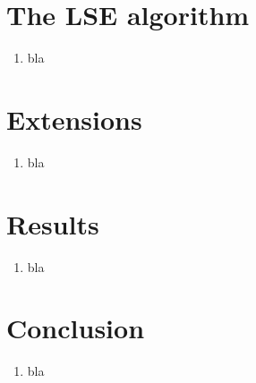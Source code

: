\documentclass[10pt]{beamer}
\begin{document}
\section{The LSE algorithm}

\begin{frame}
\begin{enumerate}
\item bla
\end{enumerate}
\end{frame}

\section{Extensions}

\begin{frame}
\begin{enumerate}
\item bla
\end{enumerate}
\end{frame}

\section{Results}

\begin{frame}
\begin{enumerate}
\item bla
\end{enumerate}
\end{frame}

\section*{Conclusion}

\begin{frame}
\begin{enumerate}
\item bla
\end{enumerate}
\end{frame}
\end{document}

